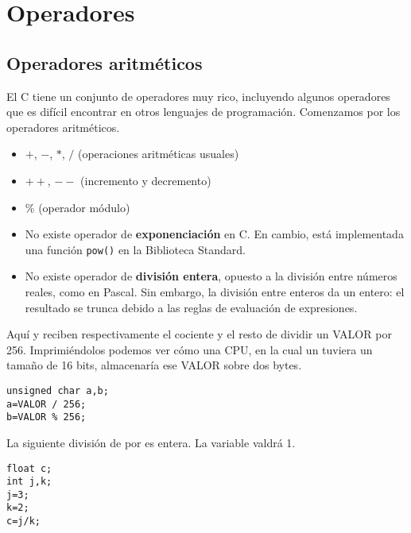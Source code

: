 \chapter{Operadores}
\section{Operadores aritméticos}

El C tiene un conjunto de operadores muy rico, incluyendo algunos operadores que es difícil encontrar en otros lenguajes de programación. Comenzamos por los operadores aritméticos.
\begin{itemize}
	\item $+$, $-$, $*$, $/$ (operaciones aritméticas usuales)
	\item $++$, $--$ (incremento y decremento)
	\item $\%$ (operador módulo)
	\item No existe operador de \textbf{exponenciación} en C. En cambio, está implementada una función \lstinline{pow()} en la Biblioteca Standard.
	\item No existe operador de \textbf{división entera}, opuesto a la división entre números reales, como en Pascal. Sin embargo, la división entre enteros da un entero: el resultado se trunca debido a las reglas de evaluación de expresiones.
\end{itemize}

\begin{ejemplo}
Aquí  y  reciben respectivamente el cociente y el resto de dividir un VALOR por 256. Imprimiéndolos podemos ver cómo una CPU, en la cual un  tuviera un tamaño de 16 bits, almacenaría ese VALOR sobre dos bytes.
\begin{lstlisting}
unsigned char a,b;
a=VALOR / 256;
b=VALOR % 256;  	
\end{lstlisting}
\end{ejemplo}  

\begin{ejemplo}
La siguiente división de  por  es entera. La variable  valdrá 1.
\begin{lstlisting}
float c;
int j,k;
j=3; 
k=2;
c=j/k; 
\end{lstlisting}
\end{ejemplo}



